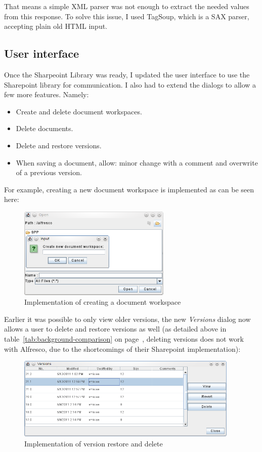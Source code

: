 That means a simple XML parser was not enough to extract the needed values from
this response. To solve this issue, I used TagSoup\cite{tagsoup}, which is a
SAX parser, accepting plain old HTML input.

\subsection{User interface}

Once the Sharpeoint Library was ready, I updated the user interface to use the
Sharepoint library for communication. I also had to extend the dialogs to allow
a few more features. Namely:

\begin{itemize}
\item Create and delete document workspaces.
\item Delete documents.
\item Delete and restore versions.
\item When saving a document, allow: minor change with a comment and overwrite of a previous version.
\end{itemize}

For example, creating a new document workspace is implemented as can be seen
here:

\begin{figure}[H]
\centering
\includegraphics[width=275px,keepaspectratio]{implementation-createdws.png}
\caption{Implementation of creating a document workspace}
\end{figure}

Earlier it was possible to only view older versions, the new \emph{Versions}
dialog now allows a user to delete and restore versions as well (as detailed
above in table~\ref{tab:background-comparison} on
page~\pageref{tab:background-comparison}, deleting versions does not work with
Alfresco, due to the shortcomings of their Sharepoint implementation):

\begin{figure}[H]
\centering
\includegraphics[width=400px,keepaspectratio]{implementation-versiondialog.png}
\caption{Implementation of version restore and delete}
\end{figure}


